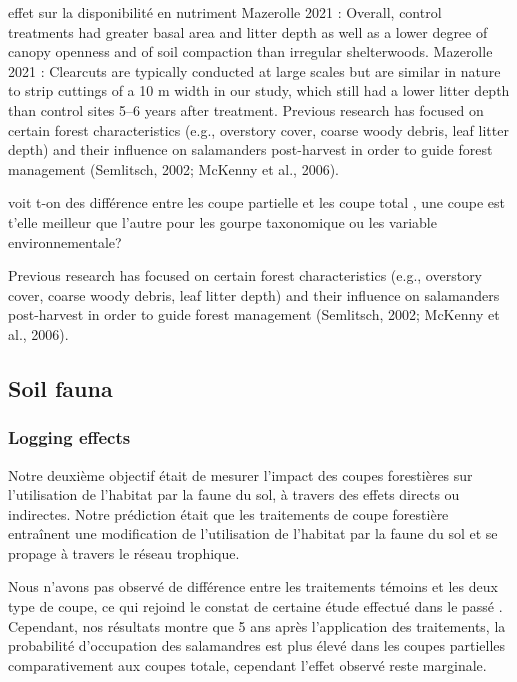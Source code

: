 effet sur la disponibilité en nutriment
Mazerolle 2021 : Overall, control treatments had greater basal area and litter depth as well as a lower degree of canopy openness and of soil compaction than irregular shelterwoods.
Mazerolle 2021 : Clearcuts are typically conducted at large scales but are similar in nature to strip cuttings of a 10 m width in our study, which still had a lower litter depth than control sites 5–6 years after treatment.
Previous research has focused on certain forest characteristics (e.g., overstory cover, coarse woody debris, leaf litter depth) and their influence on salamanders post-harvest in order to guide forest management (Semlitsch, 2002; McKenny et al., 2006).

voit t-on des différence entre les coupe partielle et les coupe total , une coupe est t'elle meilleur que l'autre pour les gourpe taxonomique ou les variable environnementale?

Previous research has focused on certain forest characteristics (e.g., overstory cover, coarse woody debris, leaf litter depth) and their influence on salamanders post-harvest in order to guide forest management (Semlitsch, 2002; McKenny et al., 2006).



\subsection*{Soil fauna}
\label{disc:soil_fauna}


\subsubsection*{Logging effects}
\label{disc:logging_effects}

Notre deuxième objectif était de mesurer l'impact des coupes forestières sur l'utilisation de l'habitat par la faune du sol, à travers des effets directs ou indirectes.
Notre prédiction était que les traitements de coupe forestière entraînent une modification de l'utilisation de l'habitat par la faune du sol et se propage à travers le réseau trophique.

Nous n'avons pas observé de différence entre les traitements témoins et les deux type de coupe, ce qui rejoind le constat de certaine étude effectué dans le passé \cite{Mazerolle2021Woodlandsalamander}.
Cependant, nos résultats montre que 5 ans après l'application des traitements, la probabilité d'occupation des salamandres est plus élevé dans les coupes partielles comparativement aux coupes totale, cependant l'effet observé reste marginale. 

